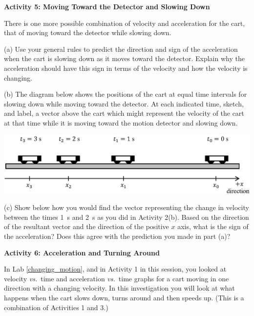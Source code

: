 \textbf{Activity 5: Moving Toward the Detector and Slowing Down }

There is one more possible combination of velocity and acceleration for the
cart, that of moving toward the detector while slowing down. 


(a) Use your general rules to predict the direction and sign of the acceleration
when the cart is slowing down as it moves toward the detector. Explain why the
acceleration should have this sign in terms of the velocity and how the 
velocity is changing. 
\answerspace{15mm}

(b) The diagram below shows the positions of the cart at equal time intervals
for slowing down while moving toward the detector. At each indicated time, 
sketch, and label,
a vector above the cart which might represent the velocity of the cart at that
time while it is moving toward the motion detector and slowing down.

{\par\centering \includegraphics{slowing/carts_slowing2.eps} \par}

(c) Show below how you would find the vector representing the change in velocity
between the times 1~s and 2~s as you did in Activity 2(b). Based on the 
direction of the resultant vector and the direction of the positive $x$ axis, 
what is the sign of the acceleration? 
Does this agree with the prediction you made in part (a)?
\answerspace{10mm}

\pagebreak[2]
\textbf{Activity 6: Acceleration and Turning Around }

In Lab \ref{changing_motion}, and in Activity 1 in this session, you looked at
velocity \textit{vs.}~time and acceleration \textit{vs.}~time graphs for a cart moving in one
direction with a changing velocity. In this investigation you will look at what
happens when the cart slows down, turns around and then speeds up. (This is a
combination of Activities 1 and 3.)

